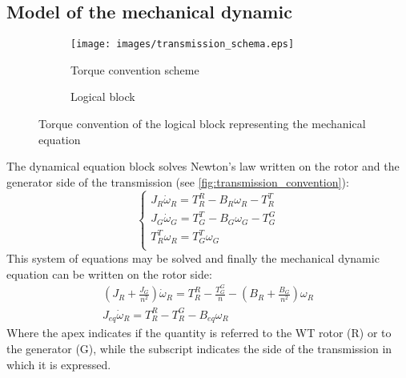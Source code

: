 \subsection[Mechanical dynamic]{Model of the mechanical dynamic}
\begin{figure}
  \centering
  \begin{subfigure}{0.6\columnwidth}
    \centering
    \texttt{[image: images/transmission\_schema.eps]}
    \caption{Torque convention scheme}
    \label{fig:transmission_convention}
  \end{subfigure}
  
  \begin{subfigure}{0.5\columnwidth}
    \centering
      
      \caption{Logical block}
    \label{fig:d_mech_equation_block}
  \end{subfigure}
  \caption{Torque convention of the logical block representing the mechanical equation}
\end{figure}
The dynamical equation block solves Newton's law written on the rotor and the generator side of the transmission (see \autoref{fig:transmission_convention}):
\begin{equation}
    \begin{cases}
      J_R \dot{\omega}_R = T_R^R - B_R\omega_R - T_R^T\\
      J_G \dot{\omega}_G = T_G^T - B_G\omega_G - T_G^G\\
      T_R^T\omega_R = T_G^T\omega_G\\
    \end{cases}
\end{equation}
This system of equations may be solved and finally the mechanical dynamic equation can be written on the rotor side:
\begin{gather}
    \left(J_R + \frac{J_G}{n^2}\right) \dot{\omega}_R = T_R^R - \frac{T_G^G}{n} - \left(B_R + \frac{B_G}{n^2}\right)\omega_R \\
    J_{eq} \dot{\omega}_R = T_R^R - T_R^G - B_{eq}\omega_R
    \label{eq:mech_eq}
\end{gather}
Where the apex indicates if the quantity is referred to the WT rotor (R) or to the generator (G), while the subscript indicates the side of the transmission in which it is expressed.

